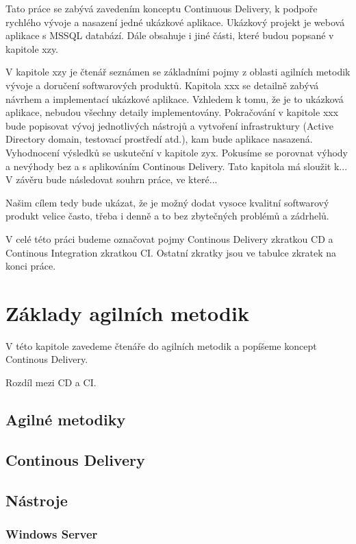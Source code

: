 Tato práce se zabývá zavedením konceptu Continuous Delivery, k podpoře rychlého vývoje a nasazení jedné ukázkové aplikace. Ukázkový projekt je webová aplikace s MSSQL databází. Dále obsahuje i jiné části, které budou popsané v kapitole xzy. 

V kapitole xzy je čtenář seznámen se základními pojmy z oblasti agilních metodik vývoje a doručení softwarových produktů. Kapitola xxx se detailně zabývá návrhem a implementací ukázkové aplikace. Vzhledem k tomu, že je to ukázková aplikace, nebudou všechny detaily implementovány. Pokračování v kapitole xxx bude popisovat vývoj jednotlivých nástrojů a vytvoření infrastruktury (Active Directory domain, testovací prostředí atd.), kam bude aplikace nasazená. Vyhodnocení výsledků se uskuteční v kapitole zyx. Pokusíme se porovnat výhody a nevýhody bez a s aplikováním Continous Delivery. Tato kapitola má sloužit k... V závěru bude následovat souhrn práce, ve které...

Našim cílem tedy bude ukázat, že je možný dodat vysoce kvalitní softwarový produkt velice často, třeba i denně a to bez zbytečných problémů a zádrhelů.

V celé této práci budeme označovat pojmy Continous Delivery zkratkou CD a Continous Integration zkratkou CI. Ostatní zkratky jsou ve tabulce zkratek na konci práce.

\chapter{Základy agilních metodik}
V této kapitole zavedeme čtenáře do agilních metodik a popíšeme koncept Continous Delivery.

Rozdíl mezi CD a CI.	

\section{Agilné metodiky}

\section{Continous Delivery}

\section{Nástroje}

\subsection{Windows Server}

